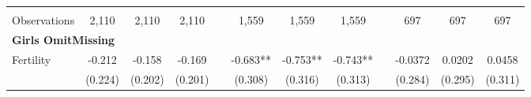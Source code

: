 \begin{landscape}
\begin{table}[htpb!]
\begin{center}
\begin{tabular}{lcccp{2mm}cccp{2mm}ccc}
\begin{footnotesize}\end{footnotesize}&\begin{footnotesize}\end{footnotesize}&\begin{footnotesize}\end{footnotesize}&\begin{footnotesize}\end{footnotesize}&\begin{footnotesize}\end{footnotesize}&\begin{footnotesize}\end{footnotesize}&\begin{footnotesize}\end{footnotesize}&\begin{footnotesize}\end{footnotesize}&\begin{footnotesize}\end{footnotesize}&\begin{footnotesize}\end{footnotesize}&\begin{footnotesize}\end{footnotesize}&\begin{footnotesize}\end{footnotesize}\\Observations&2,110&2,110&2,110&&1,559&1,559&1,559&&697&697&697\\
\multicolumn{12}{l}{\textbf{Girls OmitMissing}}\\ 
Fertility&-0.212&-0.158&-0.169&&-0.683**&-0.753**&-0.743**&&-0.0372&0.0202&0.0458\\
&(0.224)&(0.202)&(0.201)&&(0.308)&(0.316)&(0.313)&&(0.284)&(0.295)&(0.311)\\

\end{tabular}
\end{center}
\end{table}
\end{landscape}
